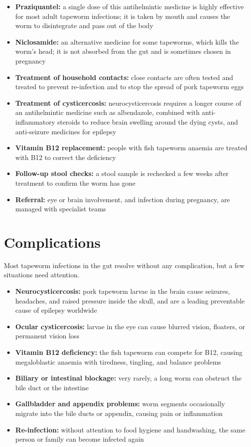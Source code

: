 \begin{itemize}
    \item \textbf{Praziquantel:} a single dose of this antihelmintic medicine is highly effective for most adult tapeworm infections; it is taken by mouth and causes the worm to disintegrate and pass out of the body
    \item \textbf{Niclosamide:} an alternative medicine for some tapeworms, which kills the worm's head; it is not absorbed from the gut and is sometimes chosen in pregnancy
    \item \textbf{Treatment of household contacts:} close contacts are often tested and treated to prevent re-infection and to stop the spread of pork tapeworm eggs
    \item \textbf{Treatment of cysticercosis:} neurocysticercosis requires a longer course of an antihelmintic medicine such as albendazole, combined with anti-inflammatory steroids to reduce brain swelling around the dying cysts, and anti-seizure medicines for epilepsy
    \item \textbf{Vitamin B12 replacement:} people with fish tapeworm anaemia are treated with B12 to correct the deficiency
    \item \textbf{Follow-up stool checks:} a stool sample is rechecked a few weeks after treatment to confirm the worm has gone
    \item \textbf{Referral:} eye or brain involvement, and infection during pregnancy, are managed with specialist teams
\end{itemize}

\section*{Complications}
Most tapeworm infections in the gut resolve without any complication, but a few situations need attention.

\begin{itemize}
    \item \textbf{Neurocysticercosis:} pork tapeworm larvae in the brain cause seizures, headaches, and raised pressure inside the skull, and are a leading preventable cause of epilepsy worldwide
    \item \textbf{Ocular cysticercosis:} larvae in the eye can cause blurred vision, floaters, or permanent vision loss
    \item \textbf{Vitamin B12 deficiency:} the fish tapeworm can compete for B12, causing megaloblastic anaemia with tiredness, tingling, and balance problems
    \item \textbf{Biliary or intestinal blockage:} very rarely, a long worm can obstruct the bile duct or the intestine
    \item \textbf{Gallbladder and appendix problems:} worm segments occasionally migrate into the bile ducts or appendix, causing pain or inflammation
    \item \textbf{Re-infection:} without attention to food hygiene and handwashing, the same person or family can become infected again
\end{itemize}

